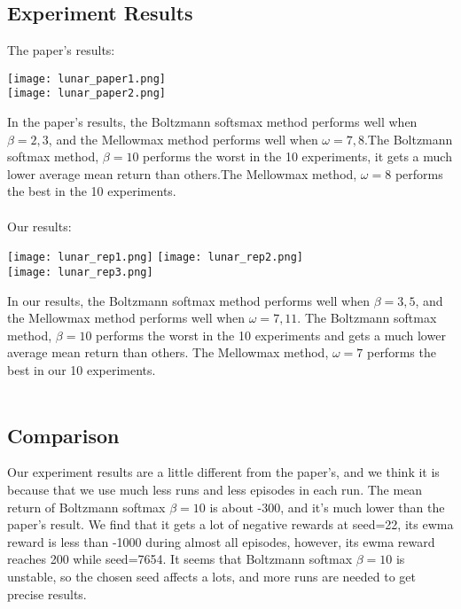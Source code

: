 \subsection*{Experiment Results}
The paper's results:\\
\begin{center}
    \texttt{[image: lunar\_paper1.png]}\\
    \texttt{[image: lunar\_paper2.png]}
\end{center}
In the paper's results, the Boltzmann softsmax method performs well when $\beta=2, 3$, and the Mellowmax method 
performs well when $\omega=7, 8$.The Boltzmann softmax method, $\beta=10$ performs the worst in the 10 experiments, it 
gets a much lower average mean return than others.The Mellowmax method, $\omega=8$ performs the best in the 10 experiments.\\\\
Our results:\\
\begin{center}
    \texttt{[image: lunar\_rep1.png]}
    \texttt{[image: lunar\_rep2.png]}\\
    \texttt{[image: lunar\_rep3.png]}
\end{center}
In our results, the Boltzmann softmax method performs well when $\beta=3, 5$, and the Mellowmax method 
performs well when $\omega=7, 11$. The Boltzmann softmax method, $\beta=10$ performs the worst in the 10 experiments and
gets a much lower average mean return than others. The Mellowmax method, $\omega=7$ performs the best in our 10 experiments.\\\\
\subsection*{Comparison}
Our experiment results are a little different from the paper's, and we think it is because that we use much less runs and less episodes in each run.
The mean return of Boltzmann softmax $\beta=10$ is about -300, and it's much lower than the paper's result. We find that it gets a lot of negative
 rewards at seed=22, its ewma reward is less than -1000 during almost all episodes, however, its ewma reward reaches 200 while seed=7654.
It seems that Boltzmann softmax $\beta=10$ is unstable, so the chosen seed affects a lots, and more runs are needed to get precise results.
